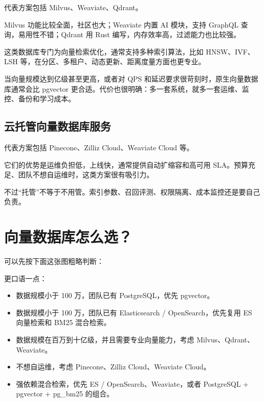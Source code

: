 \documentclass[9pt,a4paper,twocolumn]{ctexart}
\begin{document}
代表方案包括 Milvus、Weaviate、Qdrant。



Milvus 功能比较全面，社区也大；Weaviate 内置 AI 模块，支持 GraphQL 查询，易用性不错；Qdrant 用 Rust 编写，内存效率高，过滤能力也比较强。



这类数据库专门为向量检索优化，通常支持多种索引算法，比如 HNSW、IVF、LSH 等，在分区、多租户、动态更新、距离度量方面也更专业。



当向量规模达到亿级甚至更高，或者对 QPS 和延迟要求很苛刻时，原生向量数据库通常会比 pgvector 更合适。代价也很明确：多一套系统，就多一套运维、监控、备份和学习成本。



\subsection*{云托管向量数据库服务}


代表方案包括 Pinecone、Zilliz Cloud、Weaviate Cloud 等。



它们的优势是运维负担低，上线快，通常提供自动扩缩容和高可用 SLA。预算充足、团队不想自运维时，这类方案很有吸引力。



不过“托管”不等于不用管。索引参数、召回评测、权限隔离、成本监控还是要自己负责。



\section*{向量数据库怎么选？}


可以先按下面这张图粗略判断：



更口语一点：


\begin{itemize}[itemsep=1pt, topsep=2pt]
  \item 数据规模小于 100 万，团队已有 PostgreSQL，优先 pgvector。
  \item 数据规模小于 100 万，团队已有 Elasticsearch / OpenSearch，优先复用 ES 向量检索和 BM25 混合检索。
  \item 数据规模在百万到十亿级，并且需要专业向量能力，考虑 Milvus、Qdrant、Weaviate。
  \item 不想自运维，考虑 Pinecone、Zilliz Cloud、Weaviate Cloud。
  \item 强依赖混合检索，优先 ES / OpenSearch、Weaviate，或者 PostgreSQL + pgvector + pg\_bm25 的组合。
\end{itemize}
\end{document}
